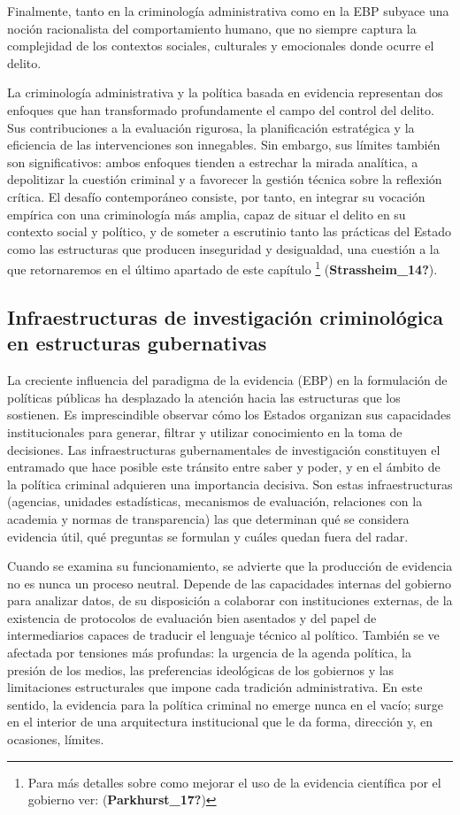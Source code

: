\documentclass[
  spanish,
  letterpaper,
  DIV=11,
  numbers=noendperiod]{scrreprt}
\begin{document}
Finalmente, tanto en la criminología administrativa como en la EBP
subyace una noción racionalista del comportamiento humano, que no
siempre captura la complejidad de los contextos sociales, culturales y
emocionales donde ocurre el delito.

La criminología administrativa y la política basada en evidencia
representan dos enfoques que han transformado profundamente el campo del
control del delito. Sus contribuciones a la evaluación rigurosa, la
planificación estratégica y la eficiencia de las intervenciones son
innegables. Sin embargo, sus límites también son significativos: ambos
enfoques tienden a estrechar la mirada analítica, a depolitizar la
cuestión criminal y a favorecer la gestión técnica sobre la reflexión
crítica. El desafío contemporáneo consiste, por tanto, en integrar su
vocación empírica con una criminología más amplia, capaz de situar el
delito en su contexto social y político, y de someter a escrutinio tanto
las prácticas del Estado como las estructuras que producen inseguridad y
desigualdad, una cuestión a la que retornaremos en el último apartado de
este capítulo \footnote{Para más detalles sobre como mejorar el uso de
  la evidencia científica por el gobierno ver: (\textbf{Parkhurst\_17?})}
(\textbf{Strassheim\_14?}).

\subsection{Infraestructuras de investigación criminológica en
estructuras
gubernativas}\label{infraestructuras-de-investigaciuxf3n-criminoluxf3gica-en-estructuras-gubernativas}

La creciente influencia del paradigma de la evidencia (EBP) en la
formulación de políticas públicas ha desplazado la atención hacia las
estructuras que los sostienen. Es imprescindible observar cómo los
Estados organizan sus capacidades institucionales para generar, filtrar
y utilizar conocimiento en la toma de decisiones. Las infraestructuras
gubernamentales de investigación constituyen el entramado que hace
posible este tránsito entre saber y poder, y en el ámbito de la política
criminal adquieren una importancia decisiva. Son estas infraestructuras
(agencias, unidades estadísticas, mecanismos de evaluación, relaciones
con la academia y normas de transparencia) las que determinan qué se
considera evidencia útil, qué preguntas se formulan y cuáles quedan
fuera del radar.

Cuando se examina su funcionamiento, se advierte que la producción de
evidencia no es nunca un proceso neutral. Depende de las capacidades
internas del gobierno para analizar datos, de su disposición a colaborar
con instituciones externas, de la existencia de protocolos de evaluación
bien asentados y del papel de intermediarios capaces de traducir el
lenguaje técnico al político. También se ve afectada por tensiones más
profundas: la urgencia de la agenda política, la presión de los medios,
las preferencias ideológicas de los gobiernos y las limitaciones
estructurales que impone cada tradición administrativa. En este sentido,
la evidencia para la política criminal no emerge nunca en el vacío;
surge en el interior de una arquitectura institucional que le da forma,
dirección y, en ocasiones, límites.
\end{document}
